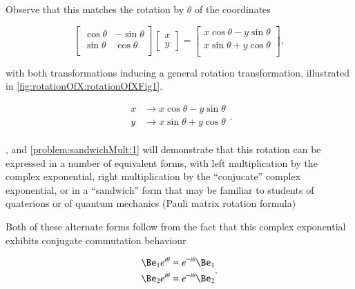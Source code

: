 Observe that this matches the rotation by \( \theta \) of the coordinates

\begin{dmath}\label{eqn:SimpleProducts2:400}
\begin{bmatrix}
   \cos\theta & - \sin\theta \\
   \sin\theta &   \cos\theta \\
\end{bmatrix}
\begin{bmatrix}
   x \\
   y
\end{bmatrix}
=
\begin{bmatrix}
   x \cos\theta  - y \sin\theta \\
   x \sin\theta  + y \cos\theta \\
\end{bmatrix},
\end{dmath}

with both transformations inducing a general rotation transformation, illustrated in \cref{fig:rotationOfX:rotationOfXFig1}.

\begin{dmath}\label{eqn:SimpleProducts2:420}
\begin{aligned}
x &\rightarrow x \cos\theta  - y \sin\theta \\
y &\rightarrow x \sin\theta  + y \cos\theta \\
\end{aligned}.
\end{dmath}

, and \cref{problem:sandwichMult:1} will demonstrate that this rotation can be expressed in a number of equivalent forms, with left multiplication by the complex exponential, right multiplication by the ``conjucate'' complex exponential, or in a ``sandwich'' form that may be familiar to students of quaterions or of quantum mechanics (Pauli matrix rotation formula)


Both of these alternate forms follow from the fact that this complex exponential exhibits conjugate commutation behaviour

\begin{dmath}\label{eqn:SimpleProducts2:480}
\begin{aligned}
   \Be_1 e^{i\theta} &= e^{-i\theta} \Be_1 \\
   \Be_2 e^{i\theta} &= e^{-i\theta} \Be_2 \\
\end{aligned}.
\end{dmath}

